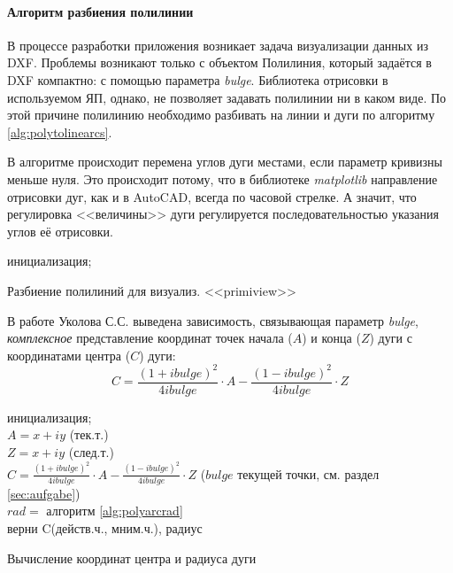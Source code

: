 \paragraph{Алгоритм разбиения полилинии}
\nopagebreak

В процессе разработки приложения возникает задача визуализации данных из DXF. Проблемы возникают только с объектом Полилиния, который задаётся в DXF компактно: с помощью параметра \textit{bulge}. Библиотека отрисовки в используемом ЯП, однако, не позволяет задавать полилинии ни в каком виде. По этой причине полилинию необходимо разбивать на линии и дуги по алгоритму \ref{alg:polytolinearcs}.

В алгоритме происходит перемена углов дуги местами, если параметр кривизны меньше нуля. Это происходит потому, что в библиотеке \textit{matplotlib} направление отрисовки дуг, как и в AutoCAD, всегда по часовой стрелке. А значит, что регулировка <<величины>> дуги регулируется последовательностью указания углов её отрисовки.

\begin{algorithm}[H]
	\SetAlgoLined
	инициализация;
	\caption{Разбиение полилиний для визуализ. <<primiview>>}
	\label{alg:polytolinearcs}
\end{algorithm}
\hfill \break

В работе Уколова С.С. \cite{ukoloff} выведена зависимость, связывающая параметр \textit{bulge},  \textit{комплексное} представление координат точек начала ($A$) и конца ($Z$) дуги с координатами центра ($C$) дуги:
\begin{equation}
	C={\frac{(1+ibulge)^2}{4ibulge}}\cdot A-{\frac{(1-ibulge)^2}{4ibulge}}\cdot Z
	\label{F:arcenter}
\end{equation}

\begin{algorithm}[H]
	\SetAlgoLined
	инициализация;\\
	$A=x+iy$ (тек.т.)\\
	$Z=x+iy$ (след.т.)\\
	$C={\frac{(1+ibulge)^2}{4ibulge}}\cdot A-{\frac{(1-ibulge)^2}{4ibulge}}\cdot Z$ ($bulge$ текущей точки, см. раздел \ref{sec:aufgabe})\\
	$rad=$ алгоритм \ref{alg:polyarcrad}\\
	верни C(действ.ч., мним.ч.), радиус
	\caption{Вычисление координат центра и радиуса дуги}
	\label{alg:polyarc_center_rad}
\end{algorithm}
\hfill \break

